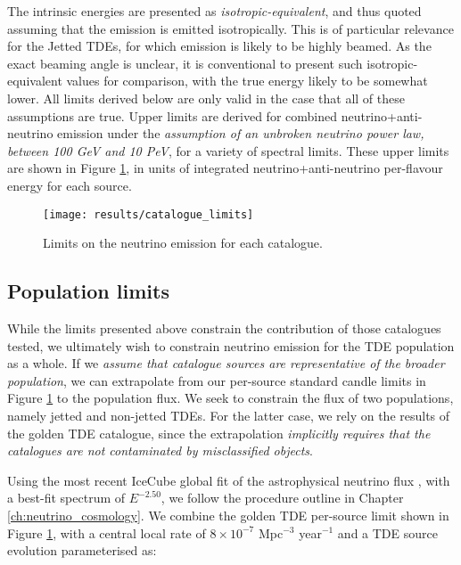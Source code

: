 The intrinsic energies are presented as \emph{isotropic-equivalent}, and thus quoted assuming that the emission is emitted isotropically. This is of particular relevance for the Jetted TDEs, for which emission is likely to be highly beamed. As the exact beaming angle is unclear, it is conventional to present such isotropic-equivalent values for comparison, with the true energy likely to be somewhat lower. All limits derived below are only valid in the case that all of these assumptions are true. Upper limits are derived for combined neutrino+anti-neutrino emission under the \emph{assumption of an unbroken neutrino power law, between 100 GeV and 10 PeV}, for a variety of spectral limits. These upper limits are shown in Figure \ref{fig:cat_upper_limit}, in units of integrated neutrino+anti-neutrino per-flavour energy for each source. 

\begin{figure}[!ht]
	\centering \texttt{[image: results/catalogue\_limits]}
	\caption{Limits on the neutrino emission for each catalogue.}
	\label{fig:cat_upper_limit}
\end{figure}

\subsection{Population limits}

While the limits presented above constrain the contribution of those catalogues tested, we ultimately wish to constrain neutrino emission for the TDE population as a whole. If we \emph{assume that catalogue sources are representative of the broader population}, we can extrapolate from our per-source standard candle limits in Figure \ref{fig:cat_upper_limit} to the population flux. We seek to constrain the flux of two populations, namely jetted and non-jetted TDEs. For the latter case, we rely on the results of the golden TDE catalogue, since the extrapolation \emph{implicitly requires that the catalogues are not contaminated by misclassified objects}.

Using the most recent IceCube global fit of the astrophysical neutrino flux , with a best-fit spectrum of $E^{-2.50}$, we follow the procedure outline in Chapter \ref{ch:neutrino_cosmology}. We combine the golden TDE per-source limit shown in Figure \ref{fig:cat_upper_limit}, with a central local rate of $8 \times 10^{-7}$ Mpc$^{-3}$ year$^{-1}$  and a TDE source evolution  parameterised as:

